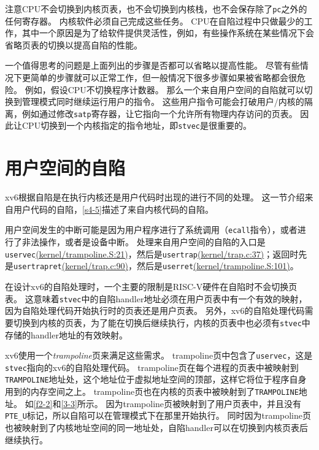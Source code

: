 注意CPU不会切换到内核页表，也不会切换到内核栈，也不会保存除了\texttt{pc}之外的任何寄存器。
内核软件必须自己完成这些任务。
CPU在自陷过程中只做最少的工作，其中一个原因是为了给软件提供灵活性，例如，有些操作系统在某些情况下会省略页表的切换以提高自陷的性能。

一个值得思考的问题是上面列出的步骤是否都可以省略以提高性能。
尽管有些情况下更简单的步骤就可以正常工作，但一般情况下很多步骤如果被省略都会很危险。
例如，假设CPU不切换程序计数器。
那么一个来自用户空间的自陷就可以切换到管理模式同时继续运行用户的指令。
这些用户指令可能会打破用户/内核的隔离，例如通过修改\texttt{satp}寄存器，让它指向一个允许所有物理内存访问的页表。
因此让CPU切换到一个内核指定的指令地址，即\texttt{stvec}是很重要的。

\section{用户空间的自陷}
xv6根据自陷是在执行内核还是用户代码时出现的进行不同的处理。
这一节介绍来自用户代码的自陷，\autoref{s4-5}描述了来自内核代码的自陷。

用户空间发生的中断可能是因为用户程序进行了系统调用（\texttt{ecall}指令），或者进行了非法操作，或者是设备中断。
处理来自用户空间的自陷的入口是\texttt{uservec}\href{https://github.com/mit-pdos/xv6-riscv/blob/riscv//kernel/trampoline.S#L21}{(kernel/trampoline.S:21)}，然后是\texttt{usertrap}\href{https://github.com/mit-pdos/xv6-riscv/blob/riscv//kernel/trap.c#L37}{(kernel/trap.c:37)}；返回时先是\texttt{usertrapret}\href{https://github.com/mit-pdos/xv6-riscv/blob/riscv//kernel/trap.c#L90}{(kernel/trap.c:90)}，然后是\texttt{userret}\href{https://github.com/mit-pdos/xv6-riscv/blob/riscv//kernel/trampoline.S#L101}{(kernel/trampoline.S:101)}。

在设计xv6的自陷处理时，一个主要的限制是RISC-V硬件在自陷时不会切换页表。
这意味着\texttt{stvec}中的自陷handler地址必须在用户页表中有一个有效的映射，因为自陷处理代码开始执行时的页表还是用户页表。
另外，xv6的自陷处理代码需要切换到内核的页表，为了能在切换后继续执行，内核的页表中也必须有\texttt{stvec}中存储的handler地址的有效映射。

xv6使用一个\emph{trampoline}页来满足这些需求。
trampoline页中包含了\texttt{uservec}，这是\texttt{stvec}指向的xv6的自陷处理代码。
trampoline页在每个进程的页表中被映射到\texttt{TRAMPOLINE}地址处，这个地址位于虚拟地址空间的顶部，这样它将位于程序自身用到的内存空间之上。
trampoline页也在内核的页表中被映射到了\texttt{TRAMPOLINE}地址。
如\autoref{f2-2}和\autoref{3-3}所示。
因为trampoline页被映射到了用户页表中，并且没有\texttt{PTE\_U}标记，所以自陷可以在管理模式下在那里开始执行。
同时因为trampoline页也被映射到了内核地址空间的同一地址处，自陷handler可以在切换到内核页表后继续执行。

